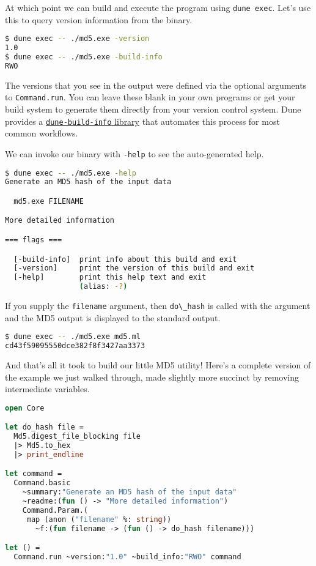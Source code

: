 At which point we can build and execute the program using
\passthrough{\lstinline!dune exec!}. Let's use this to query version
information from the binary.

\begin{lstlisting}[language=bash]
$ dune exec -- ./md5.exe -version
1.0
$ dune exec -- ./md5.exe -build-info
RWO
\end{lstlisting}

The versions that you see in the output were defined via the optional
arguments to \passthrough{\lstinline!Command.run!}. You can leave these
blank in your own programs or get your build system to generate them
directly from your version control system. Dune provides a
\href{https://dune.readthedocs.io/en/stable/executables.html\#embedding-build-information-into-executables}{\passthrough{\lstinline!dune-build-info!}
library} that automates this process for most common workflows.

We can invoke our binary with \passthrough{\lstinline!-help!} to see the
auto-generated help.

\begin{lstlisting}[language=bash]
$ dune exec -- ./md5.exe -help
Generate an MD5 hash of the input data

  md5.exe FILENAME

More detailed information

=== flags ===

  [-build-info]  print info about this build and exit
  [-version]     print the version of this build and exit
  [-help]        print this help text and exit
                 (alias: -?)
\end{lstlisting}

If you supply the \passthrough{\lstinline!filename!} argument, then
\passthrough{\lstinline!do\_hash!} is called with the argument and the
MD5 output is displayed to the standard output.

\begin{lstlisting}[language=bash]
$ dune exec -- ./md5.exe md5.ml
cd43f59095550dce382f8f3427aa3373
\end{lstlisting}

And that's all it took to build our little MD5 utility! Here's a
complete version of the example we just walked through, made slightly
more succinct by removing intermediate variables.

\begin{lstlisting}[language=Caml]
open Core

let do_hash file =
  Md5.digest_file_blocking file
  |> Md5.to_hex
  |> print_endline

let command =
  Command.basic
    ~summary:"Generate an MD5 hash of the input data"
    ~readme:(fun () -> "More detailed information")
    Command.Param.(
     map (anon ("filename" %: string))
       ~f:(fun filename -> (fun () -> do_hash filename)))

let () =
  Command.run ~version:"1.0" ~build_info:"RWO" command
\end{lstlisting}

